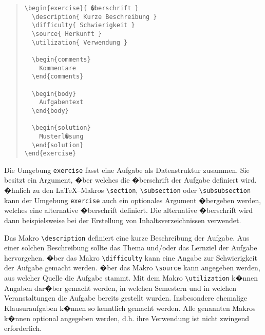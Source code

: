 \begin{quote}
\begin{verbatim}
\begin{exercise}{ �berschrift }
  \description{ Kurze Beschreibung }
  \difficulty{ Schwierigkeit }
  \source{ Herkunft }
  \utilization{ Verwendung }

  \begin{comments}
    Kommentare
  \end{comments}
   
  \begin{body}
    Aufgabentext
  \end{body}
    
  \begin{solution}
    Musterl�sung
  \end{solution}
\end{exercise}
\end{verbatim}
\end{quote}

\noindent
Die Umgebung \verb|exercise| fasst eine Aufgabe als Datenstruktur zusammen. Sie besitzt ein Argument, �ber welches die �berschrift der Aufgabe definiert wird. �hnlich zu den \LaTeX--Makros \verb|\section|, \verb|\subsection| oder
\verb|\subsubsection| kann der Umgebung \verb|exercise| auch ein optionales Argument �bergeben werden, welches eine alternative �berschrift definiert. Die alternative �berschrift wird dann beispielsweise bei der Erstellung von Inhaltsverzeichnissen verwendet.

Das Makro \verb|\description| definiert eine kurze Beschreibung der Aufgabe. Aus einer solchen Beschreibung sollte das Thema und/oder das Lernziel der Aufgabe hervorgehen. �ber das Makro \verb|\difficulty| kann eine Angabe zur Schwierigkeit der Aufgabe gemacht werden. �ber das Makro \verb|\source| kann angegeben werden, aus welcher Quelle die Aufgabe stammt. Mit dem Makro \verb|\utilization| k�nnen Angaben dar�ber gemacht werden, in welchen Semestern und in welchen Veranstaltungen die Aufgabe bereits gestellt wurden. Insbesondere ehemalige Klausuraufgaben k�nnen so kenntlich gemacht werden. Alle genannten Makros k�nnen optional angegeben werden, d.h. ihre Verwendung ist nicht zwingend erforderlich.

